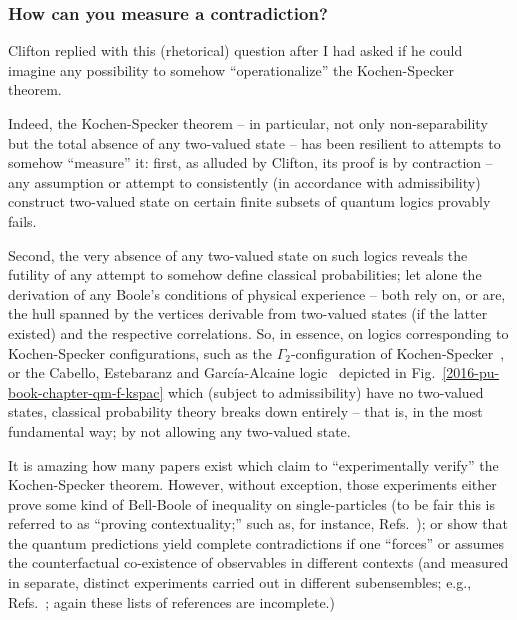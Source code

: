 \subsubsection*{How can you measure a contradiction?}

Clifton replied with this (rhetorical) question
after I had asked if he could imagine any possibility to somehow ``operationalize'' the Kochen-Specker theorem.

Indeed, the Kochen-Specker theorem -- in particular, not only non-separability but the total absence of any two-valued state --
has been resilient to attempts to somehow ``measure'' it:
first, as alluded by Clifton, its proof is by contraction --
any assumption or attempt to consistently (in accordance with admissibility)
construct two-valued state on certain finite subsets of quantum logics provably fails.

Second, the very absence of any two-valued state on such logics reveals the futility of any attempt to somehow define classical probabilities;
let alone the derivation of any Boole's conditions of physical experience --
both rely on, or are,  the hull spanned by the vertices derivable from two-valued states (if the latter existed) and the respective correlations.
So, in essence, on logics corresponding to Kochen-Specker configurations, such as
the $\Gamma_2$-configuration of Kochen-Specker~\cite[p.~69]{kochen1}, or
the Cabello, Estebaranz and Garc{\'{i}}a-Alcaine logic~\cite{cabello-96,cabello-99}
depicted in Fig.~\ref{2016-pu-book-chapter-qm-f-kspac}
which (subject to admissibility) have no two-valued states,
classical probability theory breaks down entirely -- that is, in the most fundamental way;
by not allowing any two-valued state.



It is amazing how many papers exist which claim to ``experimentally verify'' the Kochen-Specker theorem.
However, without exception, those experiments either prove some kind of Bell-Boole of inequality
on single-particles (to be fair this is referred to as ``proving contextuality;''
such as, for instance, Refs.~\cite{Hasegawa-2003,hasegawa:230401,cabelloFilipp-2008,Bartosik-09,kirch-09});
or show that the quantum predictions yield complete contradictions if  one ``forces'' or assumes the counterfactual
co-existence of
observables in different contexts (and measured in separate, distinct experiments carried out in different subensembles; e.g.,
Refs.~\cite{ghz,cabello-99,Si-Zu-Wein-Ze-2000,panbdwz,simon-2002};
again these lists of references are incomplete.)


